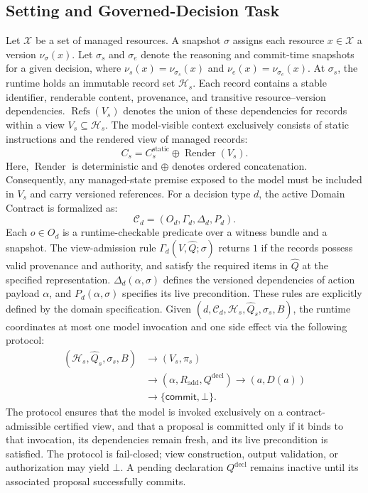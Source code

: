 \subsection{Setting and Governed-Decision Task}
Let $\mathcal X$ be a set of managed resources. A snapshot $\sigma$ assigns each resource $x \in \mathcal X$ a version $\nu_{\sigma}(x)$. Let $\sigma_s$ and $\sigma_e$ denote the reasoning and commit-time snapshots for a given decision, where $\nu_s(x)=\nu_{\sigma_s}(x)$ and $\nu_e(x)=\nu_{\sigma_e}(x)$. At $\sigma_s$, the runtime holds an immutable record set $\mathcal H_s$. Each record contains a stable identifier, renderable content, provenance, and transitive resource--version dependencies. $\operatorname{Refs}(V_s)$ denotes the union of these dependencies for records within a view $V_s\subseteq\mathcal H_s$.
The model-visible context exclusively consists of static instructions and the rendered view of managed records:
\begin{equation}
C_s=C_s^{\mathrm{static}}\oplus\operatorname{Render}(V_s).
\label{eq:certified-context}
\end{equation}
Here, $\operatorname{Render}$ is deterministic and $\oplus$ denotes ordered concatenation. Consequently, any managed-state premise exposed to the model must be included in $V_s$ and carry versioned references.
For a decision type $d$, the active Domain Contract is formalized as:
\begin{equation}
\mathcal C_d=
\left(O_d,\Gamma_d,\Delta_d,P_d\right).
\label{eq:domain-contract}
\end{equation}
Each $o\in O_d$ is a runtime-checkable predicate over a witness bundle and a snapshot. The view-admission rule $\Gamma_d(V,\widehat Q;\sigma)$ returns $1$ if the records possess valid provenance and authority, and satisfy the required items in $\widehat Q$ at the specified representation. $\Delta_d(\alpha,\sigma)$ defines the versioned dependencies of action payload $\alpha$, and $P_d(\alpha,\sigma)$ specifies its live precondition. These rules are explicitly defined by the domain specification.
Given $(d,\mathcal C_d,\mathcal H_s,\widehat Q_s,\sigma_s,B)$, the runtime coordinates at most one model invocation and one side effect via the following protocol:
\begin{equation}
\begin{aligned}
(\mathcal H_s,\widehat Q_s,\sigma_s,B)
&\longrightarrow(V_s,\pi_s)\\
&\longrightarrow(\alpha,R_{\mathrm{add}},Q^{\mathrm{decl}})
\longrightarrow(a,D(a))\\
&\longrightarrow\{\mathsf{commit},\bot\}.
\end{aligned}
\label{eq:governed-task}
\end{equation}
The protocol ensures that the model is invoked exclusively on a contract-admissible certified view, and that a proposal is committed only if it binds to that invocation, its dependencies remain fresh, and its live precondition is satisfied. The protocol is fail-closed; view construction, output validation, or authorization may yield $\bot$. A pending declaration $Q^{\mathrm{decl}}$ remains inactive until its associated proposal successfully commits.
